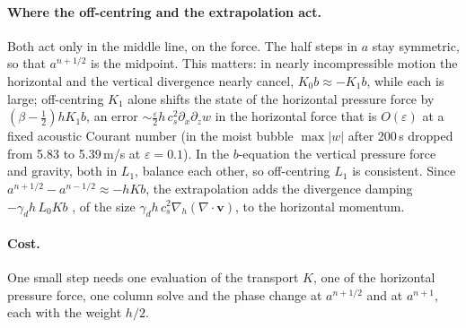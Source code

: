 \documentclass[11pt,a4paper]{article}
\begin{document}
\paragraph{Where the off-centring and the extrapolation act.} Both act only in the middle line, on the force.
The half steps in $a$ stay symmetric, so that $a^{n+1/2}$ is the midpoint. This matters: in nearly incompressible
motion the horizontal and the vertical divergence nearly cancel, $K_0b\approx-K_1b$, while each is large;
off-centring $K_1$ alone shifts the state of the horizontal pressure force by $(\beta-\tfrac12)hK_1b$, an error
$\sim\tfrac\varepsilon2h\,c_s^2\partial_x\partial_zw$ in the horizontal force that is $O(\varepsilon)$ at a fixed acoustic Courant number (in the
moist bubble $\max|w|$ after 200\,s dropped from 5.83 to 5.39\,m/s at $\varepsilon=0.1$). In the $b$-equation the vertical
pressure force and gravity, both in $L_1$, balance each other, so off-centring $L_1$ is consistent. Since
$a^{n+1/2}-a^{n-1/2}\approx-hKb$, the extrapolation adds the divergence damping $-\gamma_dh\,L_0Kb$
\cite{sk92,ksd,baldauf}, of the size $\gamma_dh\,c_s^2\nabla_h(\nabla\cdot\mathbf v)$, to the horizontal momentum.

\paragraph{Cost.} One small step needs one evaluation of the transport $K$, one of the horizontal pressure force,
one column solve and the phase change at $a^{n+1/2}$ and at $a^{n+1}$, each with the weight $h/2$.
\end{document}
